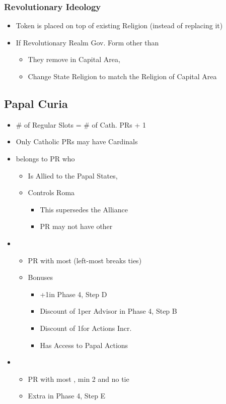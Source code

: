 \documentclass[10pt]{article}
\begin{document}
\subsubsection*{Revolutionary Ideology}
\begin{itemize}
	\item Token is placed on top of existing Religion (instead of replacing it)
	\item If Revolutionary Realm  Gov. Form other than 
	\begin{itemize}
		\item They remove \revolution in Capital Area, 
		\item Change State Religion to match the Religion of Capital Area
	\end{itemize}
\end{itemize}

\subsection*{Papal Curia }
\begin{itemize}
	\item \# of Regular \cardinal Slots = \# of Cath. PRs + 1
	\item Only Catholic PRs may have Cardinals
	\item {} belongs to PR who
	\begin{itemize}
		\item Is Allied to the \guilsinglright Papal States, 
		\item Controls Roma
		\begin{itemize}
			\item This supersedes the Alliance
			\item PR may not have other \cardinals
		\end{itemize}
	\end{itemize}
	\item {}
	\begin{itemize}
		\item PR with most \cardinals (left-most breaks ties)
		\item Bonuses
		\begin{itemize}
			\item +1\diplopower in Phase 4, Step D
			\item Discount of 1\ducat per Advisor in Phase 4, Step B
			\item Discount of 1\adminpower for Actions Incr. \stability
			\item Has Access to Papal Actions
		\end{itemize}
	\end{itemize}
	\item {}
	\begin{itemize}
		\item PR with most \cardinals, min 2 and no tie
		\item Extra \prestige in Phase 4, Step E
	\end{itemize}
\end{itemize}
\end{document}
